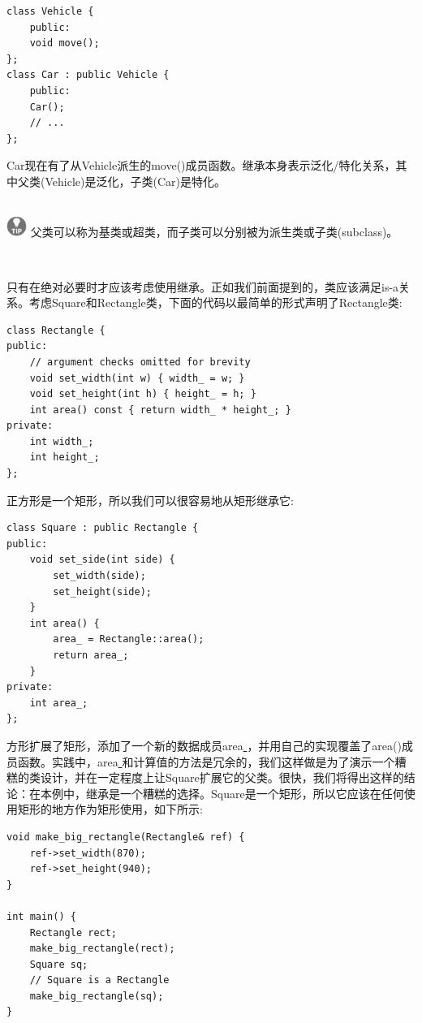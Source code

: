 \begin{lstlisting}[caption={}]
class Vehicle {
	public:
	void move();
};
class Car : public Vehicle {
	public:
	Car();
	// ...
};
\end{lstlisting}

Car现在有了从Vehicle派生的move()成员函数。继承本身表示泛化/特化关系，其中父类(Vehicle)是泛化，子类(Car)是特化。 \par

\hspace*{\fill} \\ %
\includegraphics[width=0.05\textwidth]{images/tip}
父类可以称为基类或超类，而子类可以分别被为派生类或子类(subclass)。 \par
\noindent\textbf{}\ \par

只有在绝对必要时才应该考虑使用继承。正如我们前面提到的，类应该满足is-a关系。考虑Square和Rectangle类，下面的代码以最简单的形式声明了Rectangle类: \par

\begin{lstlisting}[caption={}]
class Rectangle {
public:
	// argument checks omitted for brevity
	void set_width(int w) { width_ = w; }
	void set_height(int h) { height_ = h; }
	int area() const { return width_ * height_; }
private:
	int width_;
	int height_;
};
\end{lstlisting}

正方形是一个矩形，所以我们可以很容易地从矩形继承它: \par

\begin{lstlisting}[caption={}]
class Square : public Rectangle {
public:
	void set_side(int side) {
		set_width(side);
		set_height(side);
	}
	int area() {
		area_ = Rectangle::area();
		return area_;
	}
private:
	int area_;
};
\end{lstlisting}

方形扩展了矩形，添加了一个新的数据成员area\underline{ }，并用自己的实现覆盖了area()成员函数。实践中，area\underline{ }和计算值的方法是冗余的，我们这样做是为了演示一个糟糕的类设计，并在一定程度上让Square扩展它的父类。很快，我们将得出这样的结论：在本例中，继承是一个糟糕的选择。Square是一个矩形，所以它应该在任何使用矩形的地方作为矩形使用，如下所示:\par

\begin{lstlisting}[caption={}]
void make_big_rectangle(Rectangle& ref) {
	ref->set_width(870);
	ref->set_height(940);
}

int main() {
	Rectangle rect;
	make_big_rectangle(rect);
	Square sq;
	// Square is a Rectangle
	make_big_rectangle(sq);
}
\end{lstlisting}

